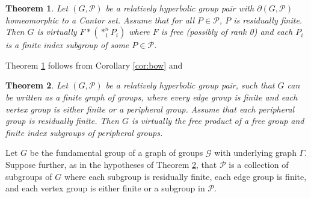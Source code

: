 \documentclass[11pt]{article}
\newtheorem{theorem}{Theorem}[section]
\theoremstyle{definition}
\begin{document}
\begin{theorem} \label{thm:Cantor} Let $(G, \mathcal{P})$ be a relatively hyperbolic group pair with $\partial(G, {\mathcal{P}})$ homeomorphic to a Cantor set.  Assume that for all $P \in {\mathcal{P}}$, $P$ is residually finite.  Then $G$ is virtually $F *(*_1^n P_i)$ where $F$ is free (possibly of rank 0) and each $P_i$ is a finite index subgroup of some $P \in \mathcal{P}$. \end{theorem} 

 
Theorem \ref{thm:Cantor} follows from Corollary \ref{cor:bow} and 

\begin{theorem} \label{thm:GOG} Let $(G,\mathcal{P})$ be a relatively hyperbolic group pair, such that $G$ can be written as a finite graph of groups, where every edge group is finite and each vertex group is either finite or a peripheral group.  Assume that each peripheral group is residually finite.  Then $G$ is virtually the free product of a free group and finite index subgroups of peripheral groups. 
\end{theorem} 





 Let $G$ be the fundamental group of a graph of groups $\mathcal{G}$ with underlying graph $\Gamma$.  Suppose further, as in the hypotheses of Theorem \ref{thm:GOG}, that  $\mathcal{P}$ is a collection of subgroups of $G$ where each subgroup is residually finite,  each edge group is finite, and each vertex group is either finite or a subgroup in $\mathcal{P}$.
\end{document}
